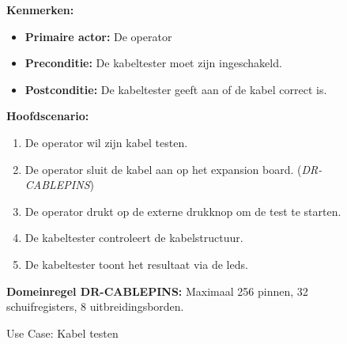 \begin{figure}[!ht]
    \centering
    \captionsetup{width=0.8\textwidth}
    \begin{tcolorbox}[colback=white, colframe=odisee-navy, title=\textbf{Use Case: Kabel testen}, width=\textwidth, sharp corners,breakable]
        \textbf{Kenmerken:}
        \begin{itemize}[noitemsep, label={}]
            \item \textbf{Primaire actor:} De operator
            \item \textbf{Preconditie:} De kabeltester moet zijn ingeschakeld.
            \item \textbf{Postconditie:} De kabeltester geeft aan of de kabel correct is.
        \end{itemize}
        
        \textbf{Hoofdscenario:}
        \begin{enumerate}[noitemsep]
            \item De operator wil zijn kabel testen.
            \item De operator sluit de kabel aan op het expansion board. (\textit{DR-CABLEPINS})
            \item De operator drukt op de externe drukknop om de test te starten.
            \item De kabeltester controleert de kabelstructuur.
            \item De kabeltester toont het resultaat via de leds.
        \end{enumerate}
        
        \tcblower %
        \textbf{Domeinregel DR-CABLEPINS:} Maximaal 256 pinnen, 32 schuifregisters, 8 uitbreidingsborden.
    \end{tcolorbox}
    \caption[Use Case Test]{Use Case: Kabel testen}
    \label{uc:Test} 
\end{figure}

